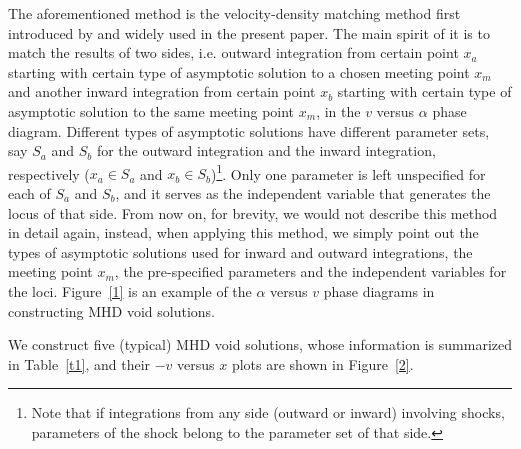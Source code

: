 \documentclass[fleqn,usenatbib]{mnras}
\begin{document}
The aforementioned method is the velocity-density matching method first introduced by \citet{hunter1977collapse} and widely used in the present paper. The main spirit of it is to match the results of two sides, i.e. outward integration from certain point $x_{a}$ starting with certain type of asymptotic solution to a chosen meeting point $x_{m}$ and another inward integration from certain point $x_{b}$ starting with certain type of asymptotic solution to the same meeting point $x_{m}$, in the $v$ versus $\alpha$ phase diagram. Different types of asymptotic solutions have different parameter sets, say $S_{a}$ and $S_{b}$ for the outward integration and the inward integration, respectively ($x_{a}\in S_{a}$ and $x_{b}\in S_{b}$)\footnote{Note that if integrations from any side (outward or inward) involving shocks, parameters of the shock belong to the parameter set of that side.}. Only one parameter is left unspecified for each of $S_{a}$ and $S_{b}$, and it serves as the independent variable that generates the locus of that side. 
From now on, for brevity, we would not describe this method in detail again, instead, when applying this method, we simply point out the types of asymptotic solutions used for inward and outward integrations, the meeting point $x_{m}$, the pre-specified parameters and the independent variables for the loci. Figure~\ref{1} is an example of the $\alpha$ versus $v$ phase diagrams in constructing MHD void solutions.

We construct five (typical) MHD void solutions, whose information is summarized in Table~\ref{t1}, and their $-v$ versus $x$ plots are shown in Figure~\ref{2}. 
\end{document}
